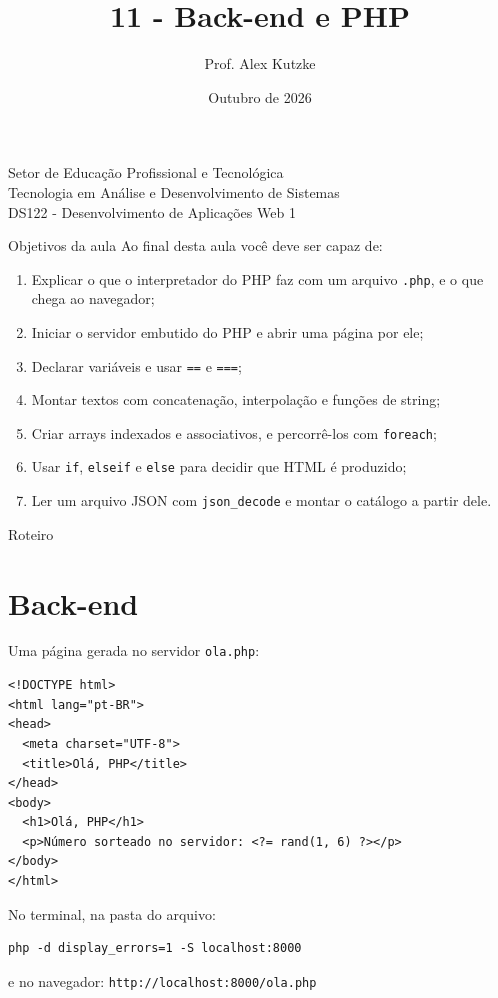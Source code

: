 \documentclass{beamer}
\title{11 - Back-end e PHP}
\author{Prof. Alex Kutzke}
\date{Outubro de 2026}
\begin{document}
\begin{frame}
	\begin{center}
		\large{Setor de Educação Profissional e Tecnológica}\\
		Tecnologia em Análise e Desenvolvimento de Sistemas\\
		\vspace{1cm}
		\small{DS122 - Desenvolvimento de Aplicações Web 1}
	\end{center}
	\titlepage
\end{frame}

\begin{frame}{Objetivos da aula}
	Ao final desta aula você deve ser capaz de:
	\begin{enumerate}
		\item Explicar o que o interpretador do PHP faz com um arquivo
		      \texttt{.php}, e o que chega ao navegador;
		\item Iniciar o servidor embutido do PHP e abrir uma página por ele;
		\item Declarar variáveis e usar \texttt{==} e \texttt{===};
		\item Montar textos com concatenação, interpolação e funções de string;
		\item Criar arrays indexados e associativos, e percorrê-los com
		      \texttt{foreach};
		\item Usar \texttt{if}, \texttt{elseif} e \texttt{else} para decidir que
		      HTML é produzido;
		\item Ler um arquivo JSON com \texttt{json\_decode} e montar o catálogo a
		      partir dele.
	\end{enumerate}
\end{frame}

\begin{frame}{Roteiro}
	\tableofcontents
\end{frame}

\section{Back-end}

\begin{frame}[fragile]{Uma página gerada no servidor}
	\texttt{ola.php}:

	\begin{verbatim}
<!DOCTYPE html>
<html lang="pt-BR">
<head>
  <meta charset="UTF-8">
  <title>Olá, PHP</title>
</head>
<body>
  <h1>Olá, PHP</h1>
  <p>Número sorteado no servidor: <?= rand(1, 6) ?></p>
</body>
</html>
	\end{verbatim}

	No terminal, na pasta do arquivo:

	\begin{verbatim}
php -d display_errors=1 -S localhost:8000
	\end{verbatim}

	\quad e no navegador: \texttt{http://localhost:8000/ola.php}
\end{frame}
\end{document}
